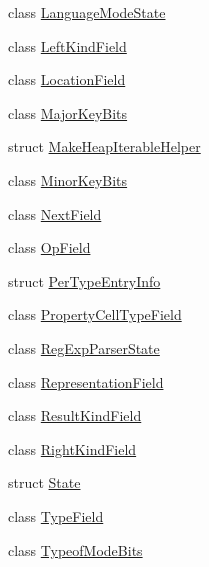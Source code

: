 \begin{DoxyCompactItemize}
class \hyperlink{classv8_1_1internal_1_1_b_a_s_e___e_m_b_e_d_d_e_d_1_1_language_mode_state}{Language\+Mode\+State}
\item 
class \hyperlink{classv8_1_1internal_1_1_b_a_s_e___e_m_b_e_d_d_e_d_1_1_left_kind_field}{Left\+Kind\+Field}
\item 
class \hyperlink{classv8_1_1internal_1_1_b_a_s_e___e_m_b_e_d_d_e_d_1_1_location_field}{Location\+Field}
\item 
class \hyperlink{classv8_1_1internal_1_1_b_a_s_e___e_m_b_e_d_d_e_d_1_1_major_key_bits}{Major\+Key\+Bits}
\item 
struct \hyperlink{structv8_1_1internal_1_1_b_a_s_e___e_m_b_e_d_d_e_d_1_1_make_heap_iterable_helper}{Make\+Heap\+Iterable\+Helper}
\item 
class \hyperlink{classv8_1_1internal_1_1_b_a_s_e___e_m_b_e_d_d_e_d_1_1_minor_key_bits}{Minor\+Key\+Bits}
\item 
class \hyperlink{classv8_1_1internal_1_1_b_a_s_e___e_m_b_e_d_d_e_d_1_1_next_field}{Next\+Field}
\item 
class \hyperlink{classv8_1_1internal_1_1_b_a_s_e___e_m_b_e_d_d_e_d_1_1_op_field}{Op\+Field}
\item 
struct \hyperlink{structv8_1_1internal_1_1_b_a_s_e___e_m_b_e_d_d_e_d_1_1_per_type_entry_info}{Per\+Type\+Entry\+Info}
\item 
class \hyperlink{classv8_1_1internal_1_1_b_a_s_e___e_m_b_e_d_d_e_d_1_1_property_cell_type_field}{Property\+Cell\+Type\+Field}
\item 
class \hyperlink{classv8_1_1internal_1_1_b_a_s_e___e_m_b_e_d_d_e_d_1_1_reg_exp_parser_state}{Reg\+Exp\+Parser\+State}
\item 
class \hyperlink{classv8_1_1internal_1_1_b_a_s_e___e_m_b_e_d_d_e_d_1_1_representation_field}{Representation\+Field}
\item 
class \hyperlink{classv8_1_1internal_1_1_b_a_s_e___e_m_b_e_d_d_e_d_1_1_result_kind_field}{Result\+Kind\+Field}
\item 
class \hyperlink{classv8_1_1internal_1_1_b_a_s_e___e_m_b_e_d_d_e_d_1_1_right_kind_field}{Right\+Kind\+Field}
\item 
struct \hyperlink{structv8_1_1internal_1_1_b_a_s_e___e_m_b_e_d_d_e_d_1_1_state}{State}
\item 
class \hyperlink{classv8_1_1internal_1_1_b_a_s_e___e_m_b_e_d_d_e_d_1_1_type_field}{Type\+Field}
\item 
class \hyperlink{classv8_1_1internal_1_1_b_a_s_e___e_m_b_e_d_d_e_d_1_1_typeof_mode_bits}{Typeof\+Mode\+Bits}
\end{DoxyCompactItemize}
